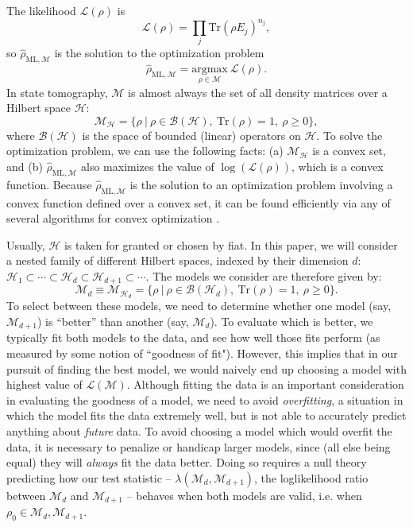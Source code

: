 \documentclass[aps,pra, twocolumn]{revtex4-1}
\newcommand{\M}{\mathcal{M}}
\newcommand{\cH}{\mathcal{H}}
\newcommand{\cL}{\mathcal{L}}
\newcommand{\rhohat}{\hat{\rho}}
\newcommand{\rhoML}[1]{\rhohat_{\scriptscriptstyle{\mathrm{ML},#1}}}
\begin{document}
The likelihood $\mathcal{L}(\rho)$ is
\begin{equation}
\mathcal{L}(\rho) = \prod_{j}\mathrm{Tr}(\rho E_{j})^{n_{j}},
\end{equation}
so $\rhoML{\M}$ is the solution to the optimization problem
\begin{equation}
\rhoML{\M} = \underset{\rho \in \M}{\text{argmax}}~\mathcal{L}(\rho).
\end{equation}
In state tomography, $\M$ is almost always the set of all density matrices over a Hilbert space $\cH$:
\begin{equation}
\mathcal{M}_{\cH} = \{\rho~|~\rho \in \mathcal{B}(\mathcal{H}),~\mathrm{Tr}(\rho) =1,~\rho \geq 0\},
\end{equation}
where $\mathcal{B}(\cH)$ is the space of bounded (linear) operators on $\cH$.  To solve the optimization problem, we can use the following facts: (a) $\M_{\cH}$ is a convex set, and (b) $\rhoML{\M}$ also maximizes the value of $\log(\cL(\rho))$, which is a convex function. Because $\rhoML{\M}$ is the solution to an optimization problem involving a convex function defined over a convex set, it can be found efficiently via any of several algorithms for convex optimization \cite{Boyd}.

Usually, $\cH$ is taken for granted or chosen by fiat.  In this paper, we will consider a nested family of different Hilbert spaces, indexed by their dimension $d$: $\cH_{1}  \subset \cdots \subset \cH_{d} \subset \cH_{d+1} \subset \cdots$.  The models we consider are therefore given by:
\begin{equation}
\M_{d} \equiv \mathcal{M}_{\cH_{d}} = \{\rho~|~\rho \in \mathcal{B}(\mathcal{H}_{d}),~\mathrm{Tr}(\rho) =1,~\rho \geq 0\}.
\end{equation}
To select between these models, we need to determine whether one model (say, $\M_{d + 1}$) is ``better'' than another (say, $\M_{d}$).  To evaluate which is better, we typically fit both models to the data, and see how well those fits perform (as measured by some notion of ``goodness of fit"). However, this implies that in our pursuit of finding the best model, we would naively end up choosing a model with highest value of $\cL(\M)$. Although fitting the data is an important consideration in evaluating the goodness of a model, we need to avoid \emph{overfitting}, a situation in which the model fits the data extremely well, but is not able to accurately predict anything about \emph{future} data. To avoid choosing a model which would overfit the data, it is necessary to penalize or handicap larger models, since (all else being equal) they will \emph{always} fit the data better.  Doing so requires a null theory predicting how our test statistic -- $\lambda(\M_{d}, \M_{d+1})$, the loglikelihood ratio between $\M_d$ and $\M_{d+1}$ -- behaves when both models are valid, i.e. when $\rho_{0} \in \M_{d},\M_{d + 1}$.
\end{document}
